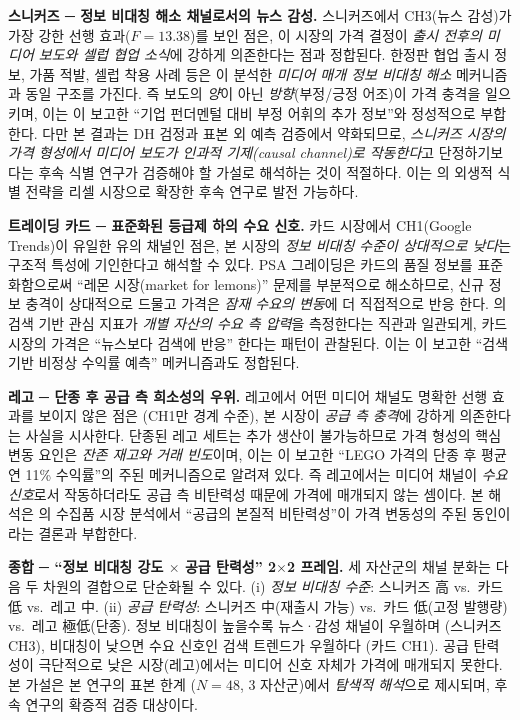 \documentclass[11pt, a4paper, twocolumn]{article}
\begin{document}
\textbf{스니커즈 ─ 정보 비대칭 해소 채널로서의 뉴스 감성.}
스니커즈에서 CH3(뉴스 감성)가 가장 강한 선행 효과($F=13.38$)를
보인 점은, 이 시장의 가격 결정이 \emph{출시 전후의 미디어 보도와
셀럽 협업 소식}에 강하게 의존한다는 점과 정합된다. 한정판 협업
출시 정보, 가품 적발, 셀럽 착용 사례 등은 \citet{tetlock2007}이 분석한
\emph{미디어 매개 정보 비대칭 해소} 메커니즘과 동일 구조를 가진다.
즉 보도의 \emph{양}이 아닌 \emph{방향}(부정/긍정 어조)이 가격 충격을
일으키며, 이는 \citet{tetlocksaarmacskassy2008}이 보고한 ``기업 펀더멘털
대비 부정 어휘의 추가 정보''와 정성적으로 부합한다. 다만 본 결과는 DH 검정과
표본 외 예측 검증에서 약화되므로, \emph{스니커즈 시장의 가격 형성에서
미디어 보도가 인과적 기제(causal channel)로 작동한다}고 단정하기보다는
후속 식별 연구가 검증해야 할 가설로 해석하는 것이 적절하다. 이는
\citet{engelbergparsons2011}의 외생적 식별 전략을 리셀 시장으로 확장한
후속 연구로 발전 가능하다.

\textbf{트레이딩 카드 ─ 표준화된 등급제 하의 수요 신호.}
카드 시장에서 CH1(Google Trends)이 유일한 유의 채널인 점은, 본 시장의
\emph{정보 비대칭 수준이 상대적으로 낮다}는 구조적 특성에 기인한다고
해석할 수 있다. PSA 그레이딩은 카드의 품질 정보를 표준화함으로써 ``레몬
시장(market for lemons)'' 문제를 부분적으로 해소하므로, 신규 정보 충격이
상대적으로 드물고 가격은 \emph{잠재 수요의 변동}에 더 직접적으로 반응
한다. \citet{daengelberggao2011}의 검색 기반 관심 지표가 \emph{개별
자산의 수요 측 압력}을 측정한다는 직관과 일관되게, 카드 시장의 가격은
``뉴스보다 검색에 반응'' 한다는 패턴이 관찰된다. 이는 \citet{josephwintokizhang2011}이
보고한 ``검색 기반 비정상 수익률 예측'' 메커니즘과도 정합된다.

\textbf{레고 ─ 단종 후 공급 측 희소성의 우위.}
레고에서 어떤 미디어 채널도 명확한 선행 효과를 보이지 않은 점은
(CH1만 경계 수준), 본 시장이 \emph{공급 측 충격}에 강하게 의존한다는
사실을 시사한다. 단종된 레고 세트는 추가 생산이 불가능하므로 가격
형성의 핵심 변동 요인은 \emph{잔존 재고와 거래 빈도}이며, 이는
\citet{dobrynskayakishilova2022}이 보고한 ``LEGO 가격의 단종 후 평균
연 11\% 수익률''의 주된 메커니즘으로 알려져 있다. 즉 레고에서는
미디어 채널이 \emph{수요 신호}로서 작동하더라도 공급 측 비탄력성
때문에 가격에 매개되지 않는 셈이다. 본 해석은 \citet{burtonjacobsen1999}의
수집품 시장 분석에서 ``공급의 본질적 비탄력성''이 가격 변동성의
주된 동인이라는 결론과 부합한다.

\textbf{종합 ─ ``정보 비대칭 강도 $\times$ 공급 탄력성'' 2$\times$2 프레임.}
세 자산군의 채널 분화는 다음 두 차원의 결합으로 단순화될 수 있다.
(i) \emph{정보 비대칭 수준}: 스니커즈 高 vs.\ 카드 低 vs.\ 레고 中.
(ii) \emph{공급 탄력성}: 스니커즈 中(재출시 가능) vs.\ 카드 低(고정 발행량)
vs.\ 레고 極低(단종). 정보 비대칭이 높을수록 뉴스·감성 채널이 우월하며
(스니커즈 CH3), 비대칭이 낮으면 수요 신호인 검색 트렌드가 우월하다
(카드 CH1). 공급 탄력성이 극단적으로 낮은 시장(레고)에서는 미디어
신호 자체가 가격에 매개되지 못한다. 본 가설은 본 연구의 표본 한계
($N=48$, 3 자산군)에서 \emph{탐색적 해석}으로 제시되며, 후속 연구의
확증적 검증 대상이다.
\end{document}
